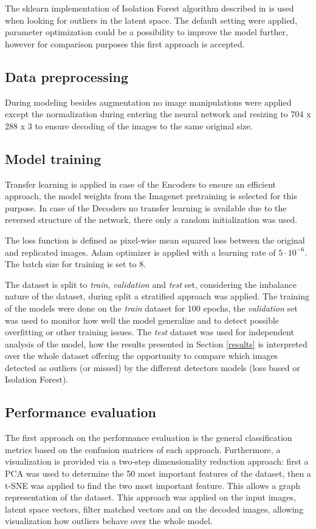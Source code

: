The sklearn implementation of Isolation Forest algorithm described in \cite{liu_isolation_2008} is used
when looking for outliers in the latent space.
The default setting were applied, parameter optimization could be a possibility to
improve the model further, however for comparison purposes this first approach is accepted.

\subsection{Data preprocessing}
During modeling besides augmentation no image manipulations were applied
except the normalization during entering the neural network
and resizing to 704 x 288 x 3 to ensure decoding of the images to the same original size.

\subsection{Model training}
Transfer learning is applied in case of the Encoders to ensure an efficient approach,
the model weights from the Imagenet pretraining is selected for this purpose.
In case of the Decoders no transfer learning is available due to the reversed structure
of the network, there only a random initialization was used.

The loss function is defined as pixel-wise mean squared loss between the original and replicated
images.
Adam optimizer is applied with a learning rate of $5 \cdot 10^{-6}$.
The batch size for training is set to 8.

The dataset is split to \emph{train}, \emph{validation} and \emph{test} set, considering the
imbalance nature of the dataset, during split a stratified approach was applied.
The training of the models were done on the \emph{train} dataset for $100$ epochs,
the \emph{validation} set was used to monitor how well the model generalize and to detect possible
overfitting or other training issues.
The \emph{test} dataset was used for independent analysis of the model, how the results presented
in Section \ref{results} is interpreted over the whole dataset offering the opportunity to compare
which images detected as outliers (or missed) by the different detectors models (loss based or
Isolation Forest).

\subsection{Performance evaluation}
The first approach on the performance evaluation is the general classification metrics based on
the confusion matrices of each approach.
Furthermore, a visualization is provided via a two-step dimensionality reduction approach:
first a PCA was used to determine the 50 most important features of the dataset,
then a t-SNE was applied to find the two most important feature.
This allows a graph representation of the dataset.
This approach was applied on the input images, latent space vectors, filter matched vectors and on
the decoded images, allowing visualization how outliers behave over the whole model.

